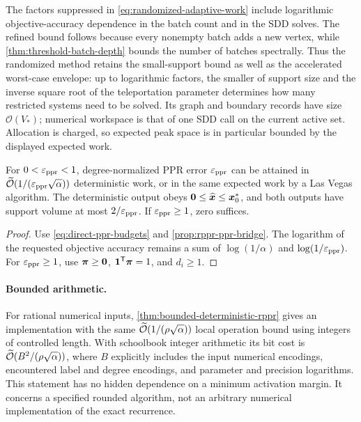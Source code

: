 The factors suppressed in \cref{eq:randomized-adaptive-work} include
logarithmic objective-accuracy dependence in the batch count and in the SDD
solves. The refined bound follows because every nonempty batch adds a new
vertex, while \cref{thm:threshold-batch-depth} bounds the number of batches
spectrally. Thus the randomized method retains the small-support bound as
well as the accelerated worst-case envelope: up to logarithmic factors,
the smaller of support size and the inverse square root of the teleportation
parameter determines how many restricted systems need to be solved.
Its graph and boundary records have size $\mathcal{O}(V_*)$; numerical workspace is
that of one SDD call on the current active set. Allocation is charged, so expected peak
space is in particular bounded by the displayed expected work.

\begin{corollary}
\label{cor:main-ppr}
For $0<\varepsilon_{\mathrm{ppr}}<1$, degree-normalized PPR error $\varepsilon_{\mathrm{ppr}}$ can be attained
in $\widetilde{\mathcal{O}}(1/(\varepsilon_{\mathrm{ppr}}\sqrt\alpha))$ deterministic work, or in the same
expected work by a Las Vegas algorithm. The deterministic output obeys
$\bm{0}\leq\widehat{\bm{x}}\leq\bm{x}_0^*$, and both outputs have support volume
at most $2/\varepsilon_{\mathrm{ppr}}$. If $\varepsilon_{\mathrm{ppr}}\geq1$, zero suffices.
\end{corollary}
\begin{proof}
Use \cref{eq:direct-ppr-budgets} and
\cref{prop:rppr-ppr-bridge}. The logarithm of the requested objective
accuracy remains a sum of $\log(1/\alpha)$ and $\log(1/\varepsilon_{\mathrm{ppr}})$.
For $\varepsilon_{\mathrm{ppr}}\geq1$, use $\bm{\pi}\geq\bm{0}$, $\mathbf{1}^{\mathsf{T}}\bm{\pi}=1$, and
$d_i\geq1$.
\end{proof}

\paragraph{Bounded arithmetic.}
For rational numerical inputs, \cref{thm:bounded-deterministic-rppr} gives
an implementation with the same $\widetilde{\mathcal{O}}(1/(\rho\sqrt\alpha))$ local
operation bound using integers of controlled length. With schoolbook
integer arithmetic its bit cost is
$\widetilde{\mathcal{O}}(B^2/(\rho\sqrt\alpha))$, where $B$ explicitly includes the
input numerical encodings, encountered label and degree encodings, and
parameter and precision logarithms. This statement has no hidden dependence
on a minimum activation margin. It concerns a specified rounded algorithm,
not an arbitrary numerical implementation of the exact recurrence.
